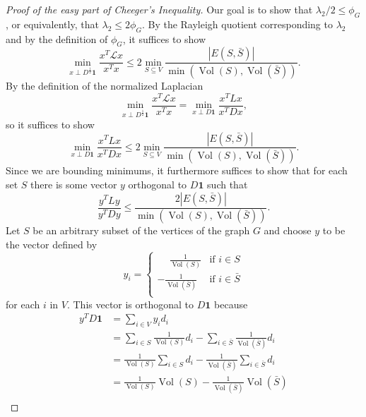 \documentclass[11pt]{article}
\newcommand{\1}{\mathbf{1}}
\newcommand{\0}{\mathbf{0}}
\DeclareMathOperator*{\Vol}{Vol}
\begin{document}
\begin{proof}[Proof of the easy part of Cheeger's Inequality]
  Our goal is to show that $\lambda_2 / 2 \leq \phi_G$, or equivalently, that $\lambda_2 \leq 2 \phi_G$.
  By the Rayleigh quotient corresponding to $\lambda_2$ and by the definition of $\phi_G$, it suffices to show
  \begin{equation*}
    \min_{x \perp D^{\frac{1}{2}} \mathbf{1}} \frac{x^T \mathcal{L} x}{x^T x} \leq 2 \min_{S \subseteq V} \frac{|E(S, \bar{S})|}{\min(\Vol(S), \Vol(\bar{S}))}.
  \end{equation*}
  By the definition of the normalized Laplacian
  \begin{equation*}
    \min_{x \perp D^{\frac{1}{2}} \1} \frac{x^T \mathcal{L} x}{x^T x} = \min_{x \perp D \1} \frac{x^T L x}{x^T D x},
  \end{equation*}
  so it suffices to show
  \begin{equation*}
    \min_{x \perp D \1} \frac{x^T L x}{x^T D x} \leq 2 \min_{S \subseteq V} \frac{|E(S, \bar{S})|}{\min(\Vol(S), \Vol(\bar{S}))}.
  \end{equation*}
  Since we are bounding minimums, it furthermore suffices to show that for each set $S$ there is some vector $y$ orthogonal to $D \1$ such that
  \begin{equation*}
    \frac{y^T L y}{y^T D y} \leq \frac{2 |E(S, \bar{S})|}{\min(\Vol(S), \Vol(\bar{S}))}.
  \end{equation*}
  Let $S$ be an arbitrary subset of the vertices of the graph $G$ and choose $y$ to be the vector defined by
  \begin{equation*}
    y_i =
    \begin{cases}
      \phantom{+}\frac{1}{\Vol(S)} & \text{if } i \in S \\
      -\frac{1}{\Vol(\bar{S})} & \text{if } i \in \bar{S} \\
    \end{cases}
  \end{equation*}
  for each $i$ in $V$.
  This vector is orthogonal to $D \1$ because
  \begin{align*}
    y^T D \1 & = \sum_{i \in V} y_i d_i \\
    & = \sum_{i \in S} \frac{1}{\Vol(S)} d_i - \sum_{i \in \bar{S}} \frac{1}{\Vol(\bar{S})} d_i \\
    & = \frac{1}{\Vol(S)} \sum_{i \in S} d_i - \frac{1}{\Vol(\bar{S})} \sum_{i \in \bar{S}} d_i \\
    & = \frac{1}{\Vol(S)} \Vol(S) - \frac{1}{\Vol(\bar{S})} \Vol(\bar{S}) \\

\end{align*}
\end{proof}
\end{document}
